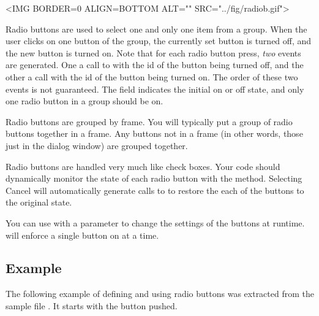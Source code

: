 
\small
\begin{rawhtml}
<IMG BORDER=0 ALIGN=BOTTOM ALT="" SRC="../fig/radiob.gif">
\end{rawhtml}
\begin{latexonly}

\end{latexonly}
\normalfont\normalsize
\vspace{.1in}

Radio buttons are used to select one and only one item from a
group. When the user clicks on one button of the group, the
currently set button is turned off, and the new button is turned
on. Note that for each radio button press, \emph{two} events are
generated. One a call to  with the
id of the button being turned off, and the other a call with the
id of the button being turned on. The order of these two events is
not guaranteed. The  field indicates the initial on
or off state, and only one radio button in a group should be on.

Radio buttons are grouped by frame. You will typically put
a group of radio buttons together in a frame. Any buttons
not in a frame (in other words, those just in the dialog
window) are grouped together.

Radio buttons are handled very much like check boxes. Your code
should dynamically monitor the state of each radio button with
the  method. Selecting Cancel will
automatically generate calls to  to restore
the each of the buttons to the original state.

You can use  with a  parameter to
change the settings of the buttons at runtime. 
will enforce a single button on at a time.

\subsection* {Example}

The following example of defining and using radio buttons was
extracted from the sample file . It
starts with the button  pushed.

